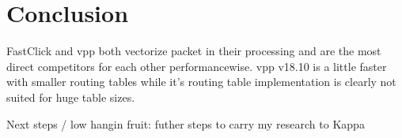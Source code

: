 \chapter{Conclusion}

FastClick and \Ac{vpp} both vectorize packet in their processing and
are the most direct competitors for each other performancewise.
\Ac{vpp} v18.10 is a little faster with smaller routing tables while
it's routing table implementation is clearly not suited for huge
table sizes. 

Next steps / low hangin fruit: futher steps to carry my research to Kappa


